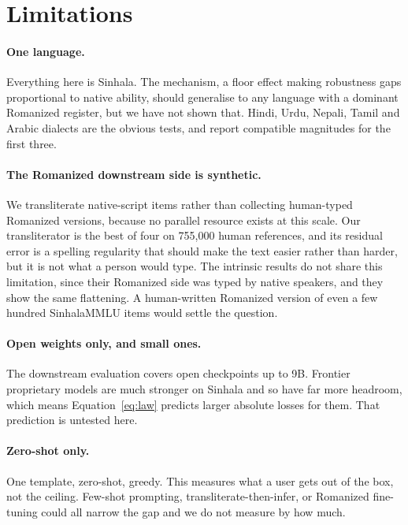 \documentclass[11pt]{article}
\begin{document}
\section*{Limitations}

\paragraph{One language.} Everything here is Sinhala. The mechanism, a floor effect
making robustness gaps proportional to native ability, should generalise to any
language with a dominant Romanized register, but we have not shown that. Hindi, Urdu,
Nepali, Tamil and Arabic dialects are the obvious tests, and
\citet{khullar-etal-2025-scriptgap} report compatible magnitudes for the first three.

\paragraph{The Romanized downstream side is synthetic.} We transliterate
native-script items rather than collecting human-typed Romanized versions, because no
parallel resource exists at this scale. Our transliterator is the best of four on
755{,}000 human references, and its residual error is a spelling regularity that
should make the text easier rather than harder, but it is not what a person would
type. The intrinsic results do not share this limitation, since their Romanized side
was typed by native speakers, and they show the same flattening. A human-written
Romanized version of even a few hundred SinhalaMMLU items would settle the question.

\paragraph{Open weights only, and small ones.} The downstream evaluation covers open
checkpoints up to 9B. Frontier proprietary models are much stronger on Sinhala
\citep{pramodya-etal-2025-sinhalammlu} and so have far more headroom, which means
Equation~\ref{eq:law} predicts larger absolute losses for them. That prediction is
untested here.

\paragraph{Zero-shot only.} One template, zero-shot, greedy. This measures what a
user gets out of the box, not the ceiling. Few-shot prompting,
transliterate-then-infer, or Romanized fine-tuning could all narrow the gap and we do
not measure by how much.
\end{document}
